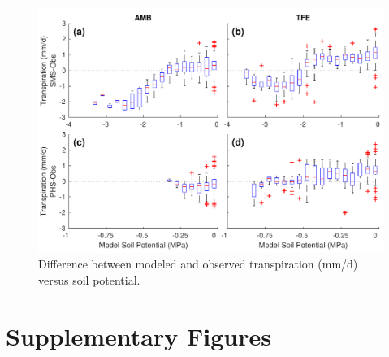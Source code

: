 \documentclass[draft,linenumbers]{agujournal}
\begin{document}
              \begin{figure}[h]
     \centering
     \includegraphics[width=30pc]{../figs3/sm3.pdf}
     \caption{Difference between modeled and observed transpiration (mm/d) versus soil potential.}
     \label{fig:cool}
  \end{figure}
          \clearpage

\clearpage

\appendix

\section{Supplementary Figures}
\end{document}
